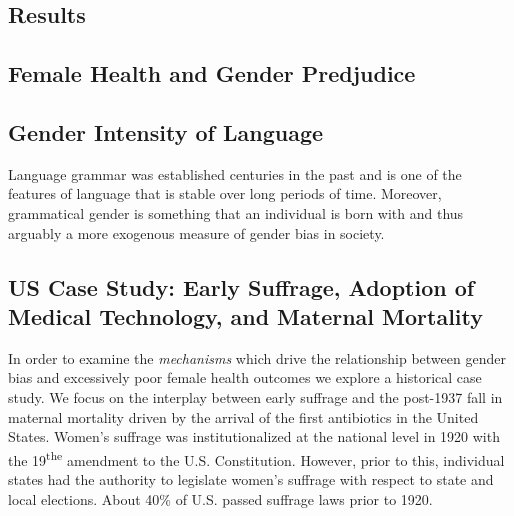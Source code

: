 \documentclass[11pt]{article}
\begin{document}
\begin{spacing}{1.4}
\section{Results}
\subsection{Female Health and Gender Predjudice}


\subsection{Gender Intensity of Language}
Language grammar was established centuries in the past and is one of the 
features of language that is stable over long periods of time. Moreover, 
grammatical gender is something that an individual is born with and thus 
arguably a more exogenous measure of gender bias in society.


\subsection{US Case Study: Early Suffrage, Adoption of Medical Technology, and 
Maternal Mortality}
In order to examine the \emph{mechanisms} which drive the relationship between
gender bias and excessively poor female health outcomes we explore a historical
case study.  We focus on the interplay between early suffrage and the post-1937 
fall in maternal mortality driven by the arrival of the first antibiotics in 
the United States. Women's suffrage was institutionalized at the national level 
in 1920 with the 19\textsuperscript{the} amendment to the U.S. Constitution. 
However, prior to this, individual states had the authority to legislate women's 
suffrage with respect to state and local elections. About 40\% of U.S. passed 
suffrage laws prior to 1920. 


\end{spacing}
\end{document}
